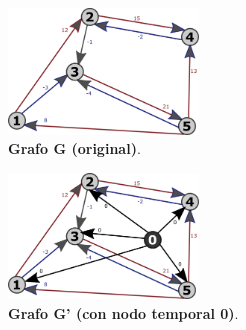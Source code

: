 \documentclass[../tp2_grupo404.tex]{subfiles}
\begin{document}
\begin{figure}[H]
    \centering
    \includegraphics[width=0.45\textwidth,angle=0,origin=c]{out/ford/ford1A.png}
    \caption{\label{fig:grafoG}\textbf{Grafo G (original)}.}
\end{figure}

\begin{figure}[H]
    \centering
    \includegraphics[width=0.45\textwidth,angle=0,origin=c]{out/ford/ford1B.png}
    \caption{\label{fig:grafoG_prima}\textbf{Grafo G' (con nodo temporal 0)}.}
\end{figure}
\end{document}

